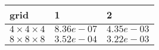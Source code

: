 \begin{tabular}{lll}
\hline
 grid                  & 1          & 2          \\
\hline
 $4 \times 4 \times 4$ & $8.36e-07$ & $4.35e-03$ \\
 $8 \times 8 \times 8$ & $3.52e-04$ & $3.22e-03$ \\
\hline
\end{tabular}